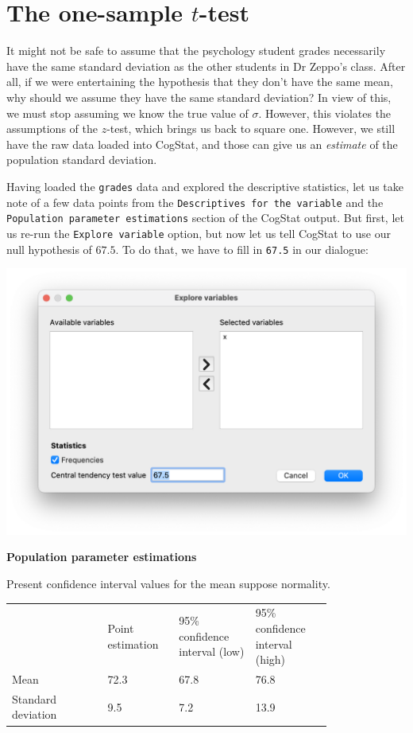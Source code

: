 \documentclass[
]{book}
\theoremstyle{definition}
\theoremstyle{definition}
\theoremstyle{definition}
\theoremstyle{definition}
\theoremstyle{remark}
\begin{document}
\hypertarget{onesamplettest}{%
\section{\texorpdfstring{The one-sample \(t\)-test}{The one-sample t-test}}\label{onesamplettest}}

It might not be safe to assume that the psychology student grades necessarily have the same standard deviation as the other students in Dr Zeppo's class. After all, if we were entertaining the hypothesis that they don't have the same mean, why should we assume they have the same standard deviation? In view of this, we must stop assuming we know the true value of \(\sigma\). However, this violates the assumptions of the \(z\)-test, which brings us back to square one. However, we still have the raw data loaded into CogStat, and those can give us an \emph{estimate} of the population standard deviation.

Having loaded the \texttt{grades} data and explored the descriptive statistics, let us take note of a few data points from the \texttt{Descriptives\ for\ the\ variable} and the \texttt{Population\ parameter\ estimations} section of the CogStat output. But first, let us re-run the \texttt{Explore\ variable} option, but now let us tell CogStat to use our null hypothesis of \(67.5\). To do that, we have to fill in \texttt{67.5} in our dialogue:

\begin{center}\includegraphics[width=0.66\linewidth]{resources/image/centraltendency} \end{center}

\begin{tcolorbox}[colback=white,
  colframe=lightgray,
  coltext=black,
  boxsep=4pt,
  boxrule=0.3pt,
  arc=0pt]
  {  \sffamily
     \color{CSblue}\textbf{Population parameter estimations}

    \color{black}
    Present confidence interval values for the mean suppose normality.

    \begin{longtable}[l]{p{0.25\linewidth}p{0.15\linewidth}p{0.20\linewidth}p{0.20\linewidth}}
    \endhead
    
    & Point estimation 
    & 95\% confidence interval (low) 
    & 95\% confidence
    interval (high) \\
    Mean & 72.3 & 67.8 & 76.8 \\
    Standard deviation & 9.5 & 7.2 & 13.9 \\
    \end{longtable}
  }
\end{tcolorbox}
\end{document}

